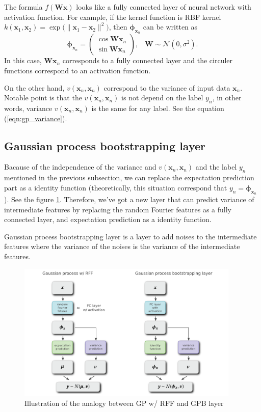 \documentclass[a4paper,onecolumn]{article}
\newcommand{\bs}[1]{\boldsymbol{#1}}
\begin{document}
The formula $f(\boldsymbol{Wx})$ looks like a fully connected layer of neural network with activation function.
For example, if the kernel function is RBF kernel $k(\bs{x}_1, \bs{x}_2) = \exp \bigl( \| \bs{x}_1 - \bs{x}_2 \|^2 \bigr)$,
then $\boldsymbol{\phi}_{\boldsymbol{x}_n}$ can be written as
\begin{equation}
    \boldsymbol{\phi}_{\boldsymbol{x}_n} =
    \begin{pmatrix}
        \cos \bs{Wx}_n \\
        \sin \bs{Wx}_n
    \end{pmatrix},
    \hspace{10pt}
    \bs{W} \sim \mathcal{N} (0, \sigma^2).
\end{equation}
In this case, $\bs{Wx}_n$ corresponds to a fully connected layer and the 
circuler functions correspond to an activation function.

On the other hand, $v(\boldsymbol{x}_n, \boldsymbol{x}_n)$ correspond to the variance of input data $\boldsymbol{x}_n$.
Notable point is that the $v(\boldsymbol{x}_n, \boldsymbol{x}_n)$ is not depend on the label $y_n$,
in other words, variance $v(\boldsymbol{x}_n, \boldsymbol{x}_n)$ is the same for any label.
See the equation (\ref{eqn:gp_variance}).

\subsection{Gaussian process bootstrapping layer}

Bacause of the independence of the variance and $v(\boldsymbol{x}_n, \boldsymbol{x}_n)$ and the label $y_n$
mentioned in the previous subsection, we can replace the expectation prediction part as a identity function
(theoretically, this situation correspond that $y_n = \bs{\phi}_{\bs{x}_n}$). See the figure \ref{fig:sketch_gpbl}.
Therefore, we've got a new layer that can predict variance of intermediate features by replacing
the random Fourier features as a fully connected layer, and expectation prediction as a identity function.

Gaussian process bootstrapping layer is a layer to add noises to the intermediate features
where the variance of the noises is the variance of the intermediate features.  

\begin{figure}[t]
    \center
    \includegraphics[width=300pt]{../figures/sketch_gpbl.pdf}
    \caption{Illustration of the analogy between GP w/ RFF and GPB layer}
    \label{fig:sketch_gpbl}
\end{figure}
\end{document}
